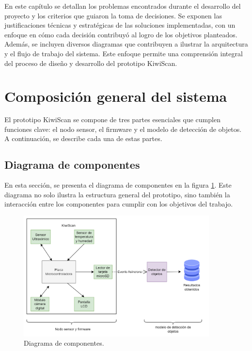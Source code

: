 
En este capítulo se detallan los problemas encontrados durante el desarrollo del proyecto y los criterios que guiaron la toma de decisiones. Se exponen las justificaciones técnicas y estratégicas de las soluciones implementadas, con un enfoque en cómo cada decisión contribuyó al logro de los objetivos planteados. Además, se incluyen diversos diagramas que contribuyen a ilustrar la arquitectura y el flujo de trabajo del sistema. Este enfoque permite una comprensión integral del proceso de diseño y desarrollo del prototipo KiwiScan.

\section{Composición general del sistema}

El prototipo KiwiScan se compone de tres partes esenciales que cumplen funciones clave: el nodo sensor, el firmware y el modelo de detección de objetos. A continuación, se describe cada una de estas partes.

\subsection{Diagrama de componentes}

En esta sección, se presenta el diagrama de componentes en la figura \ref{fig:diagrama_de_componentes}. Este diagrama no solo ilustra la estructura general del prototipo, sino también la interacción entre los componentes para cumplir con los objetivos del trabajo.

\newpage

\vspace{1cm}

\begin{figure}[htbp]
	\centering
	\includegraphics[width=0.9\textwidth, height=0.45\textheight]{./Figures/diagrama_de_componentes.png}
	\caption{Diagrama de componentes.}
	\label{fig:diagrama_de_componentes}
\end{figure}

